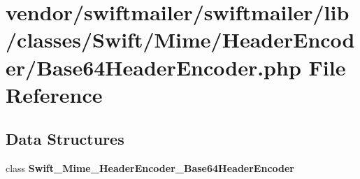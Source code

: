 \section{vendor/swiftmailer/swiftmailer/lib/classes/\+Swift/\+Mime/\+Header\+Encoder/\+Base64\+Header\+Encoder.php File Reference}
\label{_base64_header_encoder_8php}
\subsection*{Data Structures}
\begin{DoxyCompactItemize}
\item 
class {\bf Swift\+\_\+\+Mime\+\_\+\+Header\+Encoder\+\_\+\+Base64\+Header\+Encoder}
\end{DoxyCompactItemize}

